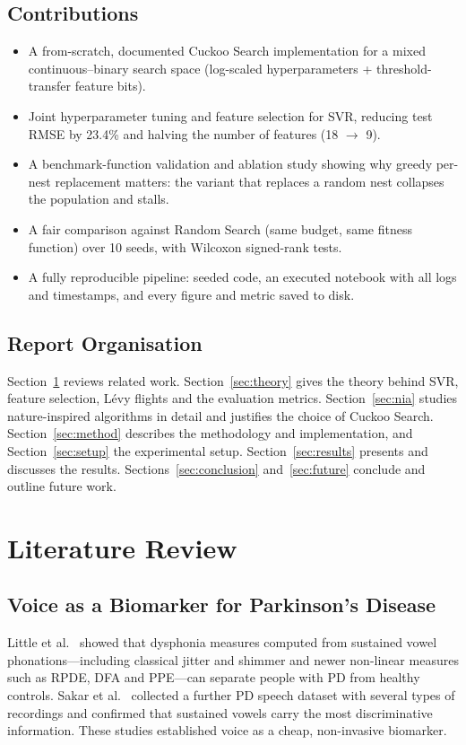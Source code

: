 \documentclass[12pt,a4paper]{article}
\numberwithin{equation}{section}
\numberwithin{table}{section}
\numberwithin{figure}{section}
\begin{document}
\subsection{Contributions}
\begin{itemize}
  \item A from-scratch, documented Cuckoo Search implementation for a mixed continuous--binary search space (log-scaled hyperparameters + threshold-transfer feature bits).
  \item Joint hyperparameter tuning and feature selection for SVR, reducing test RMSE by 23.4\% and halving the number of features (18 $\rightarrow$ 9).
  \item A benchmark-function validation and ablation study showing why greedy per-nest replacement matters: the variant that replaces a random nest collapses the population and stalls.
  \item A fair comparison against Random Search (same budget, same fitness function) over 10 seeds, with Wilcoxon signed-rank tests.
  \item A fully reproducible pipeline: seeded code, an executed notebook with all logs and timestamps, and every figure and metric saved to disk.
\end{itemize}

\subsection{Report Organisation}
Section~\ref{sec:lit} reviews related work. Section~\ref{sec:theory} gives the theory behind SVR, feature selection, Lévy flights and the evaluation metrics. Section~\ref{sec:nia} studies nature-inspired algorithms in detail and justifies the choice of Cuckoo Search. Section~\ref{sec:method} describes the methodology and implementation, and Section~\ref{sec:setup} the experimental setup. Section~\ref{sec:results} presents and discusses the results. Sections~\ref{sec:conclusion} and~\ref{sec:future} conclude and outline future work.

\section{Literature Review}\label{sec:lit}

\subsection{Voice as a Biomarker for Parkinson's Disease}
Little et al.\ \cite{little2009} showed that dysphonia measures computed from sustained vowel phonations---including classical jitter and shimmer and newer non-linear measures such as RPDE, DFA and PPE---can separate people with PD from healthy controls. Sakar et al.\ \cite{sakar2013} collected a further PD speech dataset with several types of recordings and confirmed that sustained vowels carry the most discriminative information. These studies established voice as a cheap, non-invasive biomarker.
\end{document}
